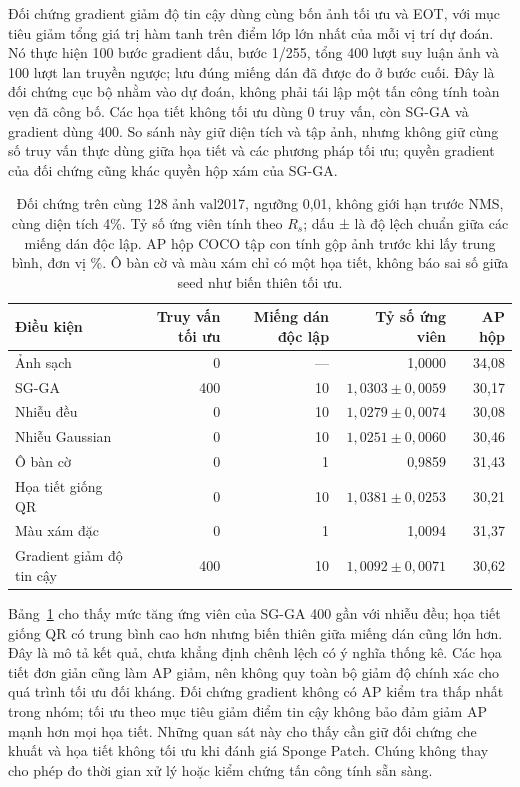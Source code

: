 \documentclass[a4paper,fleqn]{cas-dc}
\begin{document}
Đối chứng gradient giảm độ tin cậy dùng cùng bốn ảnh tối ưu và EOT, với mục tiêu giảm tổng giá trị hàm tanh trên điểm lớp lớn nhất của mỗi vị trí dự đoán. Nó thực hiện 100 bước gradient dấu, bước 1/255, tổng 400 lượt suy luận ảnh và 100 lượt lan truyền ngược; lưu đúng miếng dán đã được đo ở bước cuối. Đây là đối chứng cục bộ nhằm vào dự đoán, không phải tái lập một tấn công tính toàn vẹn đã công bố. Các họa tiết không tối ưu dùng 0 truy vấn, còn SG-GA và gradient dùng 400. So sánh này giữ diện tích và tập ảnh, nhưng không giữ cùng số truy vấn thực dùng giữa họa tiết và các phương pháp tối ưu; quyền gradient của đối chứng cũng khác quyền hộp xám của SG-GA.

\begin{table}[t]
\centering
\small
\caption{Đối chứng trên cùng 128 ảnh val2017, ngưỡng 0,01, không giới hạn trước NMS, cùng diện tích 4\%. Tỷ số ứng viên tính theo $R_s$; dấu ± là độ lệch chuẩn giữa các miếng dán độc lập. AP hộp COCO tập con tính gộp ảnh trước khi lấy trung bình, đơn vị \%. Ô bàn cờ và màu xám chỉ có một họa tiết, không báo sai số giữa seed như biến thiên tối ưu.}
\begin{tabularx}{\textwidth}{Xrrrr}
\toprule
Điều kiện & Truy vấn tối ưu & Miếng dán độc lập & Tỷ số ứng viên & AP hộp \\
\midrule
Ảnh sạch & 0 & --- & 1,0000 & 34,08 \\
SG-GA & 400 & 10 & $1{,}0303\pm0{,}0059$ & 30,17 \\
Nhiễu đều & 0 & 10 & $1{,}0279\pm0{,}0074$ & 30,08 \\
Nhiễu Gaussian & 0 & 10 & $1{,}0251\pm0{,}0060$ & 30,46 \\
Ô bàn cờ & 0 & 1 & 0,9859 & 31,43 \\
Họa tiết giống QR & 0 & 10 & $1{,}0381\pm0{,}0253$ & 30,21 \\
Màu xám đặc & 0 & 1 & 1,0094 & 31,37 \\
Gradient giảm độ tin cậy & 400 & 10 & $1{,}0092\pm0{,}0071$ & 30,62 \\
\bottomrule
\end{tabularx}
\label{tab:extended_controls}
\end{table}

Bảng~\ref{tab:extended_controls} cho thấy mức tăng ứng viên của SG-GA 400 gần với nhiễu đều; họa tiết giống QR có trung bình cao hơn nhưng biến thiên giữa miếng dán cũng lớn hơn. Đây là mô tả kết quả, chưa khẳng định chênh lệch có ý nghĩa thống kê. Các họa tiết đơn giản cũng làm AP giảm, nên không quy toàn bộ giảm độ chính xác cho quá trình tối ưu đối kháng. Đối chứng gradient không có AP kiểm tra thấp nhất trong nhóm; tối ưu theo mục tiêu giảm điểm tin cậy không bảo đảm giảm AP mạnh hơn mọi họa tiết. Những quan sát này cho thấy cần giữ đối chứng che khuất và họa tiết không tối ưu khi đánh giá Sponge Patch. Chúng không thay cho phép đo thời gian xử lý hoặc kiểm chứng tấn công tính sẵn sàng.
\end{document}
